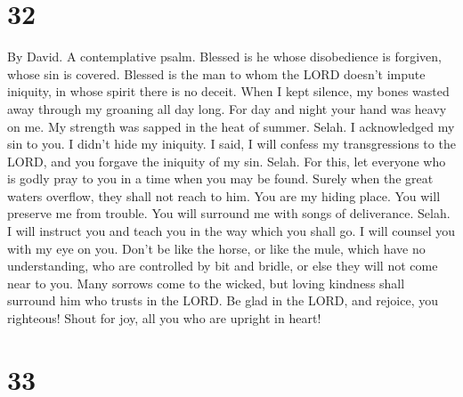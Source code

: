 \hypertarget{section-31}{%
\section{32}\label{section-31}}

By David. A contemplative psalm.  Blessed is he whose
disobedience is forgiven, whose sin is covered.  Blessed is
the man to whom the LORD doesn't impute iniquity, in whose spirit there
is no deceit.  When I kept silence, my bones wasted away
through my groaning all day long.  For day and night your
hand was heavy on me. My strength was sapped in the heat of summer.
Selah.  I acknowledged my sin to you. I didn't hide my
iniquity. I said, I will confess my transgressions to the LORD, and you
forgave the iniquity of my sin. Selah.  For this, let
everyone who is godly pray to you in a time when you may be found.
Surely when the great waters overflow, they shall not reach to him.
 You are my hiding place. You will preserve me from trouble.
You will surround me with songs of deliverance. Selah.  I
will instruct you and teach you in the way which you shall go. I will
counsel you with my eye on you.  Don't be like the horse, or
like the mule, which have no understanding, who are controlled by bit
and bridle, or else they will not come near to you.  Many
sorrows come to the wicked, but loving kindness shall surround him who
trusts in the LORD.  Be glad in the LORD, and rejoice, you
righteous! Shout for joy, all you who are upright in heart!

\hypertarget{section-32}{%
\section{33}\label{section-32}}

